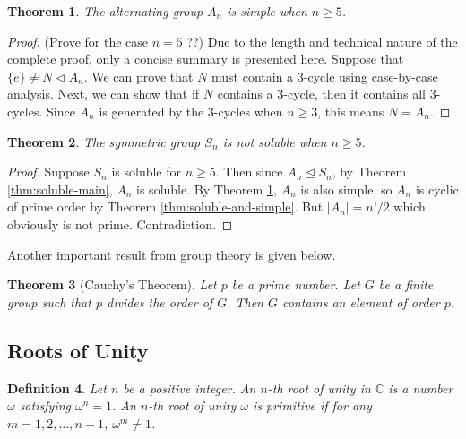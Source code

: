 \documentclass[12pt]{article}
\newtheorem{theorem}{Theorem}
\newtheorem{definition}[theorem]{Definition}
\begin{document}
\begin{theorem} \label{thm:simple-alternating}
    The alternating group $A_n$ is simple when $n \ge 5$.
\end{theorem}

\begin{proof}
    (Prove for the case $n=5$ ??) Due to the length and technical nature of the
    complete proof, only a concise summary is presented here.
    Suppose that $\{ e \} \neq N \triangleleft A_n$. We can prove that $N$ must
    contain a $3$-cycle using case-by-case analysis. Next, we can show that if
    $N$
    contains a $3$-cycle, then it contains all $3$-cycles. Since $A_n$ is
    generated
    by the $3$-cycles when $n \ge 3$, this means $N = A_n$.
\end{proof}

\begin{theorem} \label{thm:symmetric-not-soluble}
    The symmetric group $S_n$ is not soluble when $n \ge 5$.
\end{theorem}

\begin{proof}
    Suppose $S_n$ is soluble for $n \ge 5$. Then since $A_n \trianglelefteq
        S_n$, by Theorem \ref{thm:soluble-main}, $A_n$ is soluble. By Theorem
    \ref{thm:simple-alternating}, $A_n$ is also simple, so $A_n$ is cyclic of
    prime
    order by Theorem \ref{thm:soluble-and-simple}. But $|A_n| = n! / 2$ which
    obviously is not prime. Contradiction.
\end{proof}

Another important result from group theory is given below.

\begin{theorem}[Cauchy's Theorem] \label{thm:cauchy}
    Let $p$ be a prime number. Let $G$ be a finite group such that $p$ divides
    the order of $G$. Then $G$ contains an element of order $p$.
\end{theorem}

\subsection{Roots of Unity}
\begin{definition}
    Let $n$ be a positive integer. An $n$-th root of unity in $\mathbb C$ is a
    number $\omega$ satisfying $\omega ^ n = 1$. An $n$-th root of unity
    $\omega$
    is primitive if for any $m = 1, 2, \dots, n - 1$, $\omega ^ m \neq 1$.
\end{definition}
\end{document}
